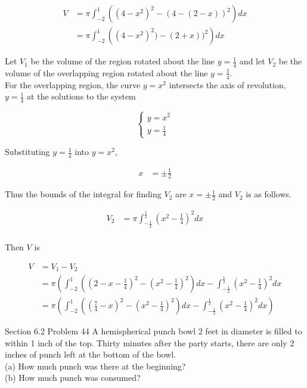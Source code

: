\documentclass{article}
\begin{document}
    \begin{align*}
        V   &= \pi \int_{-2}^1 \left((4-x^2)^2-(4-(2-x))^2\right)dx \\
            &= \pi\int_{-2}^1 \left((4-x^2)^2) - (2+x))^2\right)dx
    \end{align*}

    Let $V_1$ be the volume of the region rotated about the line $y=\frac{1}{4}$ and let $V_2$ be the volume of the overlapping region rotated about the line $y=\frac{1}{4}$. \\

    For the overlapping region, the curve $y=x^2$ intersects the axis of revolution, $y=\frac{1}{4}$ at the solutions to the system

    \[
        \begin{cases}
            y = x^2 \\
            y = \frac{1}{4}
        \end{cases}
    \]

    Substituting $y=\frac{1}{4}$ into $y=x^2$,

    \begin{align*}
       x    &= \pm \frac{1}{2}
    \end{align*}

    Thus the bounds of the integral for finding $V_2$ are $x=\pm\frac{1}{2}$ and $V_2$ is as follows.

    \begin{align*}
        V_2 &= \pi\int_{-\frac{1}{2}}^{\frac{1}{2}}  \left(x^2-\frac{1}{4}\right)^2 dx \\
    \end{align*}

    Then $V$ is

    \begin{align*}
        V   &= V_1 - V_2 \\
            &= \pi \left(\int_{-2}^1 \left(\left(2-x-\frac{1}{4}\right)^2-\left(x^2-\frac{1}{4}\right)^2\right)dx- \int_{-\frac{1}{2}}^{\frac{1}{2}}  \left(x^2-\frac{1}{4}\right)^2 dx \\
            &= \pi \left(\int_{-2}^1 \left(\left(\frac{7}{4}-x\right)^2-\left(x^2-\frac{1}{4}\right)^2\right)dx - \int_{-\frac{1}{2}}^{\frac{1}{2}}  \left(x^2-\frac{1}{4}\right)^2 dx\right)
    \end{align*}



    \begin{tbhtheorem}{Section 6.2 Problem 44}
        A hemispherical punch bowl 2 feet in diameter is filled to within 1 inch of the top. Thirty minutes after the party starts, there are only 2 inches of punch left at the bottom of the bowl. \\
        (a) How much punch was there at the beginning? \\
        (b) How much punch was consumed?
    \end{tbhtheorem}
\end{document}
